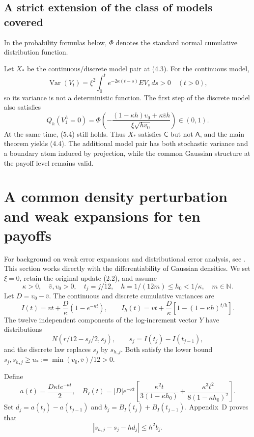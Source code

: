 \subsection{A strict extension of the class of models covered}

In the probability formulas below, \(\Phi\) denotes the standard normal cumulative distribution function.

Let \(X_*\) be the continuous/discrete model pair at (4.3). For the continuous model,
\[
\operatorname{Var}(V_t)=\xi^2\int_0^t e^{-2\kappa(t-s)}EV_s\,ds>0
\quad(t>0),
\tag{5.5}
\]
so its variance is not a deterministic function. The first step of the discrete model also satisfies
\[
Q_h(V_1^h=0)=
\Phi\!\left(
-\frac{(1-\kappa h)v_0+\kappa\bar v h}{\xi\sqrt{hv_0}}
\right)\in(0,1).
\tag{5.6}
\]
At the same time, (5.4) still holds. Thus \(X_*\) satisfies \(\mathsf C\) but not \(\mathsf A\), and the main theorem yields (4.4). The additional model pair has both stochastic variance and a boundary atom induced by projection, while the common Gaussian structure at the payoff level remains valid.


\section{A common density perturbation and weak expansions for ten payoffs}

For background on weak error expansions and distributional error analysis, see
\cite{TalayTubaro1990,MickelNeuenkirch2023,BallyTalay1996}.
This section works directly with the differentiability of Gaussian densities.
We set \(\xi=0\), retain the original update (2.2), and assume
\[
\kappa>0,\quad \bar v,v_0>0,\quad
t_j=j/12,\quad h=1/(12m)\le h_0<1/\kappa,\quad m\in\mathbb N.
\tag{6.1}
\]
Let \(D=v_0-\bar v\). The continuous and discrete cumulative variances are
\[
I(t)=\bar vt+\frac D\kappa(1-e^{-\kappa t}),\qquad
I_h(t)=\bar vt+\frac D\kappa[1-(1-\kappa h)^{t/h}].
\tag{6.2}
\]
The twelve independent components of the log-increment vector \(Y\) have distributions
\[
N(r/12-s_j/2,s_j),\qquad s_j=I(t_j)-I(t_{j-1}),
\tag{6.3}
\]
and the discrete law replaces \(s_j\) by \(s_{h,j}\).
Both satisfy the lower bound
\(s_j,s_{h,j}\ge u_*:=\min(v_0,\bar v)/12>0\).

Define
\[
a(t)=\frac{D\kappa t e^{-\kappa t}}2,
\quad
B_I(t)=|D|e^{-\kappa t}
\left[
\frac{\kappa^2t}{3(1-\kappa h_0)}
+\frac{\kappa^3t^2}{8(1-\kappa h_0)^2}
\right].
\tag{6.4}
\]
Set \(d_j=a(t_j)-a(t_{j-1})\) and
\(b_j=B_I(t_j)+B_I(t_{j-1})\). Appendix~D proves that
\[
|s_{h,j}-s_j-hd_j|\le h^2b_j.
\tag{6.5}
\]

